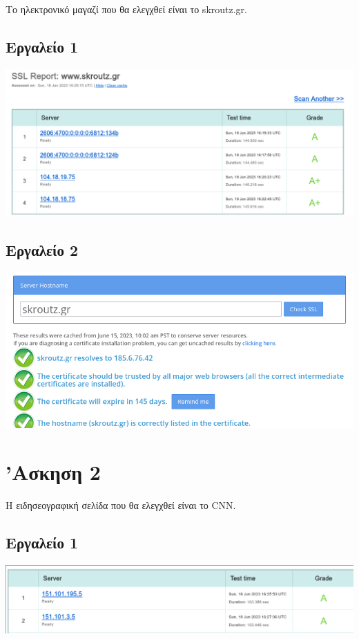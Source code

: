 \documentclass[12pt]{article}
\begin{document}
Το ηλεκτρονικό μαγαζί που θα ελεγχθεί είναι το skroutz.gr.

\subsection{Εργαλείο 1}

\includegraphics[width=\textwidth]{res/skroutz1.png} \\

\subsection{Εργαλείο 2}

\includegraphics[width=\textwidth]{res/skroutz2.png} \\

\section{'Ασκηση 2}

Η ειδησεογραφική σελίδα που θα ελεγχθεί είναι το CNN. 

\subsection{Εργαλείο 1}

\includegraphics[width=\textwidth]{res/cnn1.png} \\
\end{document}
